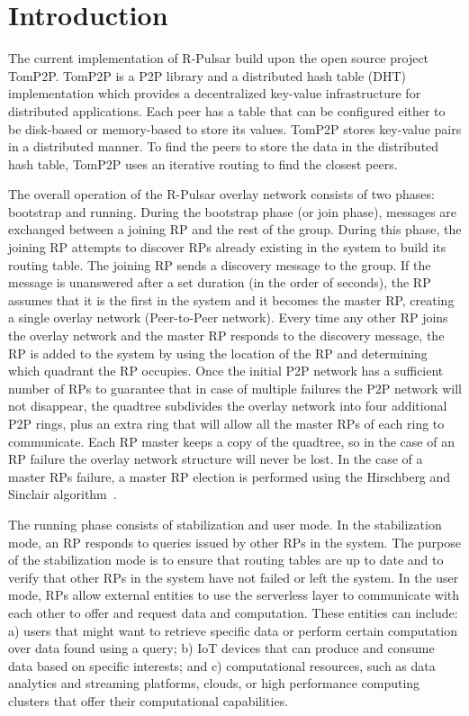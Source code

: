 \section{Introduction}

The current implementation of R-Pulsar build upon the open source project TomP2P. TomP2P is a P2P library and a distributed hash table (DHT) implementation which provides a decentralized key-value infrastructure for distributed applications. Each peer has a table that can be configured either to be disk-based or memory-based to store its values. TomP2P stores key-value pairs in a distributed manner. To find the peers to store the data in the distributed hash table, TomP2P uses an iterative routing to find the closest peers. 

The overall operation of the R-Pulsar overlay network consists of two phases: bootstrap and running. During the bootstrap phase (or join phase), messages are exchanged between a joining RP and the rest of the group. During this phase, the joining RP attempts to discover RPs already existing in the system to build its routing table. The joining RP sends a discovery message to the group. If the message is unanswered after a set duration (in the order of seconds), the RP assumes that it is the first in the system and it becomes the master RP, creating a single overlay network (Peer-to-Peer network). Every time any other RP joins the overlay network and the master RP responds to the discovery message, the  RP is added to the system by using the location of the RP and determining which quadrant the RP occupies. Once the initial P2P network has a sufficient number of RPs to guarantee that in case of multiple failures the P2P network will not disappear, the quadtree subdivides the overlay network into four additional P2P rings, plus an extra ring that will allow all the master RPs of each ring to communicate. Each RP master keeps a copy of the quadtree, so in the case of an RP failure the overlay network structure will never be lost. In the case of a master RPs failure, a master RP election is performed using the Hirschberg and Sinclair algorithm~\cite{Hirschberg}.

The running phase consists of stabilization and user mode. In the stabilization mode, an RP responds to queries issued by other RPs in the system. The purpose of the stabilization mode is to ensure that routing tables are up to date and to verify that other RPs in the system have not failed or left the system. In the user mode, RPs allow external entities to use the serverless layer to communicate with each other to offer and request data and computation. These entities can include: a) users that might want to retrieve specific data or perform certain computation over data found using a query; b) IoT devices that can produce and consume data based on specific interests; and c) computational resources, such as data analytics and streaming platforms, clouds, or high performance computing clusters that offer their computational capabilities.


